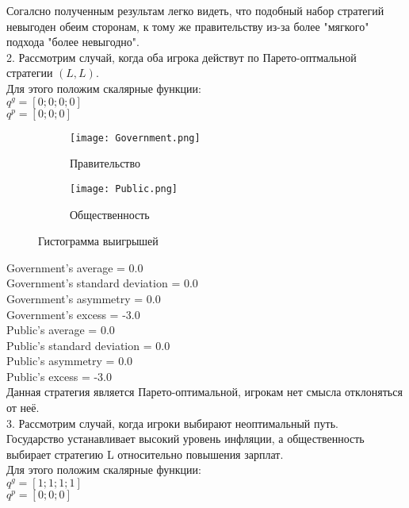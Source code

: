 Согалсно полученным результам легко видеть, что подобный набор стратегий невыгоден обеим сторонам, к тому же правительству из-за более "мягкого" подхода "более невыгодно".\\


2. Рассмотрим случай, когда оба игрока действут по Парето-оптмальной стратегии $(L,L)$.
\\

Для этого положим скалярные функции:\\
$q^g =[ 0; 0; 0; 0 ]$ \\
$q^p=[ 0; 0; 0] $ \\


\begin{figure}[h]
	
	\begin{subfigure}{0.5\textwidth}
		\texttt{[image: Government.png]} 
		\caption{Правительство}
		\label{fig:government}
	\end{subfigure}
	\begin{subfigure}{0.5\textwidth}
		\texttt{[image: Public.png]}
		\caption{Общественность}
		\label{fig:public}
	\end{subfigure}
	
	\caption{Гистограмма выигрышей}
	\label{fig:stat}
\end{figure}

Government's average = 0.0\\
Government's standard deviation = 0.0\\
Government's asymmetry = 0.0\\
Government's excess = -3.0\\
Public's average = 0.0\\
Public's standard deviation = 0.0\\
Public's asymmetry = 0.0\\
Public's excess = -3.0\\

Данная стратегия является Парето-оптимальной, игрокам нет смысла отклоняться от неё. \\


3. Рассмотрим случай, когда игроки выбирают неоптимальный путь.\\
 Государство устанавливает высокий уровень инфляции, а общественность выбирает стратегию L относительно повышения зарплат.\\
	Для этого положим скалярные функции:\\
	$q^g =[ 1; 1; 1; 1 ]$ \\
	$q^p=[ 0; 0; 0] $ \\
	
